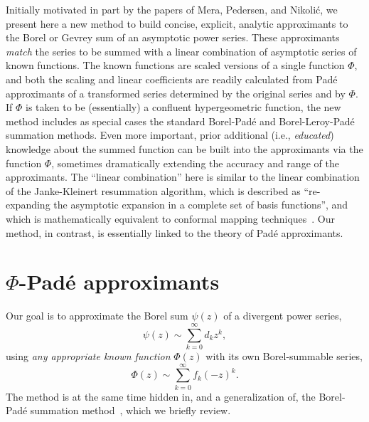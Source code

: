 \documentclass[12pt]{iopart}
\begin{document}
Initially motivated in part by the papers of Mera, Pedersen, and Nikoli\'c, we present
here a new method to build concise, explicit, analytic approximants to the Borel or Gevrey sum of an asymptotic power
series. These approximants {\em match} the series to be summed with a linear combination of asymptotic series of known functions.
The known functions are scaled versions of a single function $\Phi$, and both the scaling and linear coefficients are readily calculated from Pad\'e approximants of 
a transformed series determined by the original series and by $\Phi$. If $\Phi$ is taken to be
(essentially) a confluent hypergeometric function, the new method includes as
special cases the standard Borel-Pad\'e and Borel-Leroy-Pad\'e summation methods.
Even more important, prior additional (i.e., {\em educated})  knowledge about the summed function can be built into
the approximants via the function $\Phi$, sometimes dramatically extending the accuracy and range of the approximants.
The ``linear combination'' here is similar to the linear combination of the Janke-Kleinert resummation algorithm,
which is described as ``re-expanding the asymptotic expansion in a complete set of basis functions'',
and which is mathematically equivalent to conformal mapping techniques~\cite{KL01}. Our method, in contrast, is essentially linked to the theory of Pad\'e approximants.
\section{$\Phi$-Pad\'e approximants}
Our goal is to approximate the Borel sum $\psi(z)$ of a divergent power series,
%
\begin{equation}
	\label{eq:psi}
	\psi(z) \sim \sum_{k=0}^\infty d_k z^k ,
\end{equation}
%
using {\em any appropriate known function} $\Phi(z)$ with its own Borel-summable series,
%
\begin{equation}
	\Phi(z) \sim \sum_{k=0}^\infty f_k (-z)^k.
	\label{eq:Phi}
\end{equation}
%
The method is at the same time hidden in, and a generalization of, the Borel-Pad\'e summation
method~\cite{AL00}, which we briefly review.
\end{document}

